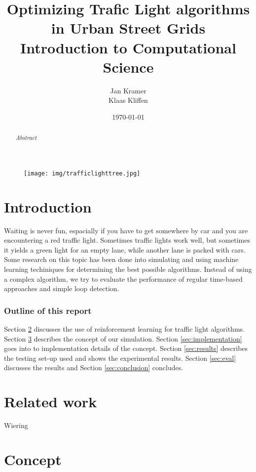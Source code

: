\documentclass[a4paper,11pt]{article}
\title{Optimizing Trafic Light algorithms in Urban Street Grids\\
\large Introduction to Computational Science}
\author{Jan Kramer\\Klaas Kliffen}
\date{\today}
\begin{document}
\begin{titlepage}
\maketitle
\thispagestyle{empty}
\begin{abstract}
\textit{
 Abstract
}
\end{abstract}
\medskip\medskip
\begin{figure}[H]
  \centering
  \texttt{[image: img/trafficlighttree.jpg]}
\end{figure}


\end{titlepage}

\newpage
\tableofcontents

\newpage

\section{Introduction}
Waiting is never fun, espacially if you have to get somewhere by car and you are encountering a red traffic light.
Sometimes traffic lights work well, but sometimes it yields a green light for an empty lane, while another lane is packed with cars.
Some research on this topic has been done into simulating and using machine learning techiniques for determining the best
possible algorithms.
Instead of using a complex algorithm, we try to evaluate the performance of regular time-based approaches and simple loop detection.

\subsubsection*{Outline of this report}
Section \ref{sec:rel} discusses the use of reinforcement learning for traffic light algorithms.
Section \ref{sec:concept} describes the concept of our simulation.
Section \ref{sec:implementation} goes into to implementation details of the concept.
Section \ref{sec:results} describes the testing set-up used and shows the experimental results.
Section \ref{sec:eval} discusses the results and Section \ref{sec:conclusion} concludes.

\section{Related work}\label{sec:rel}

Wiering \cite{Wiering00}

\section{Concept}\label{sec:concept}
\end{document}
